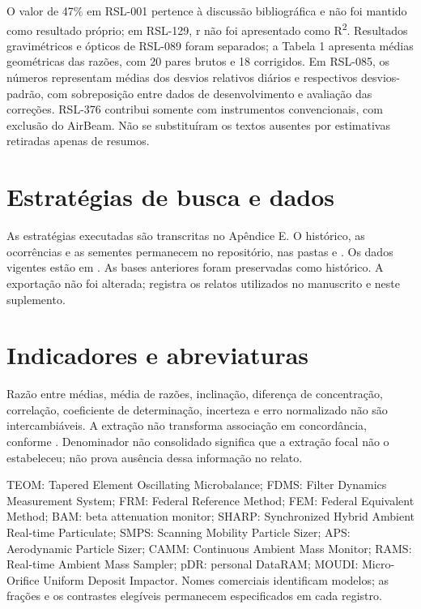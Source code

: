 O valor de 47\% em RSL-001 pertence à discussão bibliográfica e não foi mantido como resultado próprio; em RSL-129, r não foi apresentado como R\textsuperscript{2}. Resultados gravimétricos e ópticos de RSL-089 foram separados; a Tabela 1 apresenta médias geométricas das razões, com 20 pares brutos e 18 corrigidos. Em RSL-085, os números representam médias dos desvios relativos diários e respectivos desvios-padrão, com sobreposição entre dados de desenvolvimento e avaliação das correções. RSL-376 contribui somente com instrumentos convencionais, com exclusão do AirBeam. Não se substituíram os textos ausentes por estimativas retiradas apenas de resumos.

\section*{Estratégias de busca e dados}
As estratégias executadas são transcritas no Apêndice E. O histórico, as ocorrências e as sementes permanecem no repositório, nas pastas  e . Os dados vigentes estão em . As bases anteriores foram preservadas como histórico. A exportação  não foi alterada;  registra os relatos utilizados no manuscrito e neste suplemento.

\section*{Indicadores e abreviaturas}
Razão entre médias, média de razões, inclinação, diferença de concentração, correlação, coeficiente de determinação, incerteza e erro normalizado não são intercambiáveis. A extração não transforma associação em concordância, conforme \textcite{bland1986}. Denominador não consolidado significa que a extração focal não o estabeleceu; não prova ausência dessa informação no relato.

TEOM: Tapered Element Oscillating Microbalance; FDMS: Filter Dynamics Measurement System; FRM: Federal Reference Method; FEM: Federal Equivalent Method; BAM: beta attenuation monitor; SHARP: Synchronized Hybrid Ambient Real-time Particulate; SMPS: Scanning Mobility Particle Sizer; APS: Aerodynamic Particle Sizer; CAMM: Continuous Ambient Mass Monitor; RAMS: Real-time Ambient Mass Sampler; pDR: personal DataRAM; MOUDI: Micro-Orifice Uniform Deposit Impactor. Nomes comerciais identificam modelos; as frações e os contrastes elegíveis permanecem especificados em cada registro.

